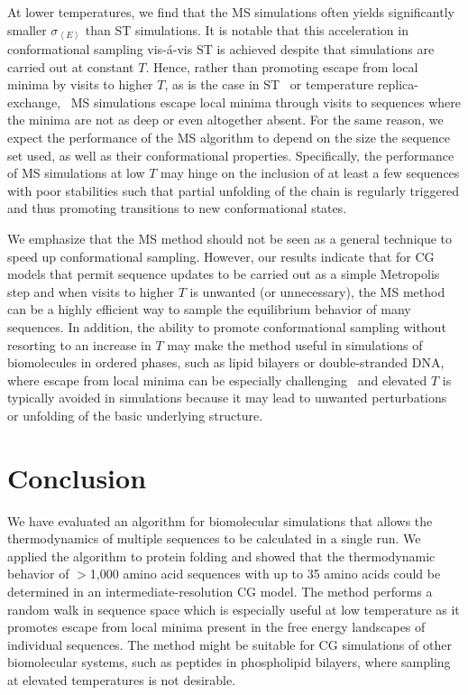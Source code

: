 \documentclass[
aip,
rsi,%
amsmath,amssymb,
reprint,%
]{revtex4-1}
\newcommand {\sigE}	{{\sigma_{\left < E \right >}}}
\begin{document}
At lower temperatures, we find that the MS simulations often yields significantly smaller $\sigE$ than ST simulations. It is notable that this acceleration in conformational sampling vis-{\'a}-vis ST is achieved despite that simulations are carried out at constant $T$. Hence, rather than promoting escape from local minima by visits to higher $T$, as is the case in  ST~\cite{Marinari1992,Lyubartsev1992} or temperature replica-exchange,~\cite{Swendsen1986}  MS simulations escape local minima through visits to sequences where the minima are not as deep or even altogether absent. For the same reason, we expect the performance of the MS algorithm to depend on the size the sequence set used, as well as their conformational properties.  Specifically, the performance of MS simulations at low $T$ may hinge on the inclusion of at least a few sequences with poor stabilities such that partial unfolding of the chain is regularly triggered and thus promoting transitions to new conformational states. 

We emphasize that the MS method should not be seen as a general technique to speed up conformational sampling. However, our results indicate that for CG models that permit sequence updates to be carried out as a simple Metropolis step and when visits to higher $T$ is unwanted (or unnecessary), the MS method can be a highly efficient way to sample the equilibrium behavior of many sequences. In addition, the ability to promote conformational sampling without resorting to an increase in $T$ may make the method useful in simulations of biomolecules in ordered phases, such as lipid bilayers or double-stranded DNA, where escape from local minima can be especially challenging~\cite{Bereau2015,Curuksu2009} and elevated $T$ is typically avoided in simulations because it may lead to unwanted perturbations or unfolding of the basic underlying structure.

\section{Conclusion}
\noindent
We have evaluated an algorithm for biomolecular simulations that allows the thermodynamics of multiple  sequences to be calculated in a single run. We applied the algorithm to protein folding and showed that the thermodynamic behavior of $>$1,000 amino acid sequences with up to 35 amino acids could be determined in an intermediate-resolution CG model. The method performs a random walk in sequence space which is especially useful at low temperature as it promotes escape from local minima present in the free energy landscapes of individual sequences. The method might be suitable for CG simulations of other biomolecular systems, such as peptides in phospholipid bilayers, where sampling at elevated temperatures is not desirable. 


\end{document}
